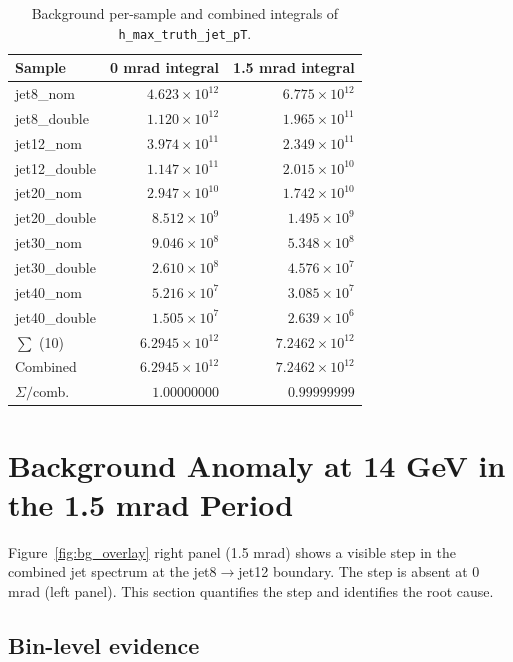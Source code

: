\documentclass[11pt,a4paper]{article}
\begin{document}
\begin{table}[H]
\centering
\small
\begin{tabular}{lrr}
\toprule
Sample         & 0 mrad integral       & 1.5 mrad integral    \\
\midrule
jet8\_nom      & $4.623\times10^{12}$  & $6.775\times10^{12}$  \\
jet8\_double   & $1.120\times10^{12}$  & $1.965\times10^{11}$  \\
jet12\_nom     & $3.974\times10^{11}$  & $2.349\times10^{11}$  \\
jet12\_double  & $1.147\times10^{11}$  & $2.015\times10^{10}$  \\
jet20\_nom     & $2.947\times10^{10}$  & $1.742\times10^{10}$  \\
jet20\_double  & $8.512\times10^{9}$   & $1.495\times10^{9}$   \\
jet30\_nom     & $9.046\times10^{8}$   & $5.348\times10^{8}$   \\
jet30\_double  & $2.610\times10^{8}$   & $4.576\times10^{7}$   \\
jet40\_nom     & $5.216\times10^{7}$   & $3.085\times10^{7}$   \\
jet40\_double  & $1.505\times10^{7}$   & $2.639\times10^{6}$   \\
\midrule
$\sum$ (10)    & $6.2945\times10^{12}$ & $7.2462\times10^{12}$ \\
Combined       & $6.2945\times10^{12}$ & $7.2462\times10^{12}$ \\
$\Sigma/$comb. & $1.00000000$          & $0.99999999$          \\
\bottomrule
\end{tabular}
\caption{Background per-sample and combined integrals of \texttt{h\_max\_truth\_jet\_pT}.}
\label{tab:bg_integrals}
\end{table}

\section{Background Anomaly at 14 GeV in the 1.5 mrad Period}
\label{sec:bg_anomaly}

Figure~\ref{fig:bg_overlay} right panel (1.5 mrad) shows a visible step in the combined jet spectrum at the jet8$\rightarrow$jet12 boundary. The step is absent at 0 mrad (left panel). This section quantifies the step and identifies the root cause.

\subsection{Bin-level evidence}
\end{document}
